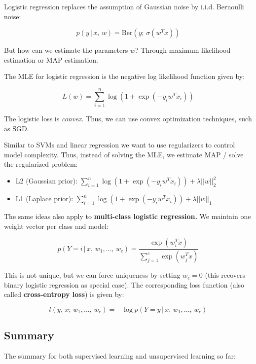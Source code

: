 \documentclass[a4paper]{extarticle}
\begin{document}
Logistic regression replaces the assumption of Gaussian noise by i.i.d. Bernoulli noise:

\[
    p(y \, | \, x, \, w) = \text{Ber}(y; \, \sigma(w^Tx))
\]

But how can we estimate the parameters $w$? Through maximum likelihood estimation or MAP estimation.

The MLE for logistic regression is the negative log likelihood function given by:

\[
    L(w) = \sum_{i = 1}^n \log(1 + \exp(-y_iw^Tx_i))
\]

The logistic loss is \textit{convex.} Thus, we can use convex optimization techniques, such as SGD.

Similar to SVMs and linear regression we want to use regularizers to control model complexity. Thus, instead of solving the MLE, we estimate MAP / solve the regularized problem:

\begin{itemize}
    \item L2 (Gaussian prior): $\sum_{i = 1}^n \log(1 + \exp(-y_iw^Tx_i)) + \lambda ||w||_2^2$
    \item L1 (Laplace prior): $\sum_{i = 1}^n \log(1 + \exp(-y_iw^Tx_i)) + \lambda ||w||_1$
\end{itemize}

The same ideas also apply to \textbf{multi-class logistic regression.} We maintain one weight vector per class and model:

\[
    p(Y = i \, | \, x, \, w_1,..., \, w_c) = \frac{\exp(w^T_ix)}{\sum_{j = 1}^c \exp(w_j^Tx)}
\]

This is not unique, but we can force uniqueness by setting $w_c = 0$ (this recovers binary logistic regression as special case). The corresponding loss function (also called \textbf{cross-entropy loss}) is given by:

\[
    l(y, \, x; \, w_1,..., \, w_c) = - \log p(Y = y \, | \, x, \, w_1,..., \, w_c)
\]

\subsection{Summary}

The summary for both supervised learning and unsupervised learning so far:
\end{document}
